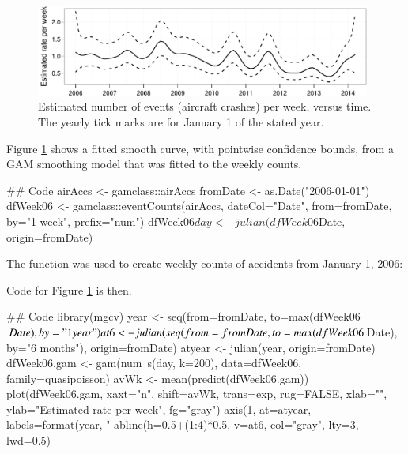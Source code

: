 \begin{fullwidth}
\begin{figure}
\vspace*{-12pt}
\begin{Schunk}


\centerline{\includegraphics[width=0.98\textwidth]{figs/9-plotGAM-byWk-1} }

\end{Schunk}
\vspace*{-6pt}
\caption{Estimated number of events (aircraft crashes) per week,
  versus time.  The yearly tick marks are for January 1 of the
  stated year.\label{fig:planeCrash}}
\end{figure}
\end{fullwidth}

Figure \ref{fig:planeCrash} shows a fitted smooth curve, with
pointwise confidence bounds, from a GAM smoothing model that
was fitted to the weekly counts. 

\begin{Schunk}
\begin{Sinput}
## Code
airAccs <- gamclass::airAccs
fromDate <- as.Date("2006-01-01")
dfWeek06 <- gamclass::eventCounts(airAccs, dateCol="Date",
                                  from=fromDate,
                                by="1 week", prefix="num")
dfWeek06$day <- julian(dfWeek06$Date, origin=fromDate)
\end{Sinput}
\end{Schunk}
The function  was used to create
weekly counts of accidents from January 1, 2006:

Code for Figure \ref{fig:planeCrash} is then.
\begin{fullwidth}

\begin{Schunk}
\begin{Sinput}
## Code
library(mgcv)
year <- seq(from=fromDate, to=max(dfWeek06$Date), by="1 year")
at6 <- julian(seq(from=fromDate, to=max(dfWeek06$Date), by="6 months"), origin=fromDate)
atyear <- julian(year, origin=fromDate)
dfWeek06.gam <- gam(num~s(day, k=200), data=dfWeek06, family=quasipoisson)
avWk <- mean(predict(dfWeek06.gam))
plot(dfWeek06.gam, xaxt="n", shift=avWk, trans=exp, rug=FALSE,
     xlab="", ylab="Estimated rate per week", fg="gray")
axis(1, at=atyear, labels=format(year, "%
abline(h=0.5+(1:4)*0.5, v=at6, col="gray", lty=3, lwd=0.5)
\end{Sinput}
\end{Schunk}

\end{fullwidth}

